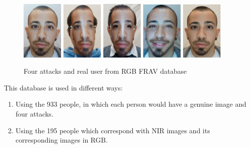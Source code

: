 \begin{figure}[htb]
\centering
\includegraphics[width=0.18\textwidth]{images_databases/fravrgb/at1-1.JPG}
\includegraphics[width=0.18\textwidth]{images_databases/fravrgb/at2-1.JPG}
\includegraphics[width=0.18\textwidth]{images_databases/fravrgb/at3-1.JPG}
\includegraphics[width=0.18\textwidth]{images_databases/fravrgb/at4-1.JPG}
\includegraphics[width=0.18\textwidth]{images_databases/fravrgb/real1.JPG}

\caption{Four attacks and real user from RGB FRAV database } \label{fig:RGB-frav2}
\end{figure}

This database is used in different ways:
\begin{enumerate}
  \item Using the 933 people, in which each person would have a genuine image and four attacks.
  \item Using the 195 people which correspond with NIR images and its corresponding images in RGB.
\end{enumerate}

